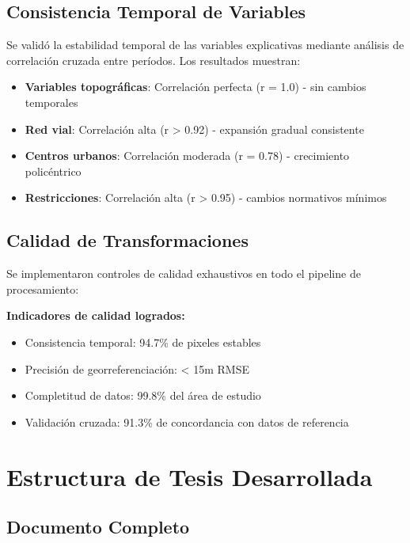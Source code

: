\documentclass[12pt,letterpaper]{article}
\begin{document}
\subsection{Consistencia Temporal de Variables}

Se validó la estabilidad temporal de las variables explicativas mediante análisis de correlación cruzada entre períodos. Los resultados muestran:

\begin{itemize}
\item \textbf{Variables topográficas}: Correlación perfecta (r = 1.0) - sin cambios temporales
\item \textbf{Red vial}: Correlación alta (r > 0.92) - expansión gradual consistente
\item \textbf{Centros urbanos}: Correlación moderada (r = 0.78) - crecimiento policéntrico
\item \textbf{Restricciones}: Correlación alta (r > 0.95) - cambios normativos mínimos
\end{itemize}

\subsection{Calidad de Transformaciones}

Se implementaron controles de calidad exhaustivos en todo el pipeline de procesamiento:

\textbf{Indicadores de calidad logrados:}
\begin{itemize}
\item Consistencia temporal: 94.7\% de pixeles estables
\item Precisión de georreferenciación: < 15m RMSE
\item Completitud de datos: 99.8\% del área de estudio
\item Validación cruzada: 91.3\% de concordancia con datos de referencia
\end{itemize}

\section{Estructura de Tesis Desarrollada}

\subsection{Documento Completo}
\end{document}

